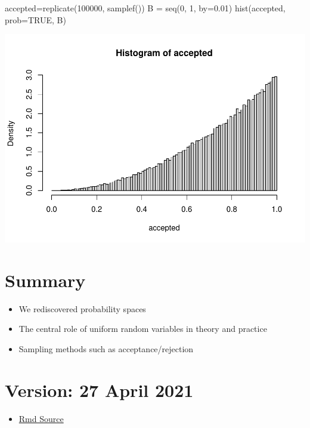 \documentclass[
]{article}
\newenvironment{Shaded}{\begin{snugshade}}{\end{snugshade}}
\newcommand{\AttributeTok}[1]{\textcolor[rgb]{0.77,0.63,0.00}{#1}}
\newcommand{\ConstantTok}[1]{\textcolor[rgb]{0.00,0.00,0.00}{#1}}
\newcommand{\DecValTok}[1]{\textcolor[rgb]{0.00,0.00,0.81}{#1}}
\newcommand{\FloatTok}[1]{\textcolor[rgb]{0.00,0.00,0.81}{#1}}
\newcommand{\FunctionTok}[1]{\textcolor[rgb]{0.00,0.00,0.00}{#1}}
\newcommand{\NormalTok}[1]{#1}
\newcommand{\OtherTok}[1]{\textcolor[rgb]{0.56,0.35,0.01}{#1}}
\providecommand{\tightlist}{%
  \setlength{\itemsep}{0pt}\setlength{\parskip}{0pt}}
\theoremstyle{definition}
\theoremstyle{definition}
\theoremstyle{definition}
\theoremstyle{remark}
\begin{document}
\begin{Shaded}
\begin{Highlighting}[]
\NormalTok{accepted}\OtherTok{=}\FunctionTok{replicate}\NormalTok{(}\DecValTok{100000}\NormalTok{, }\FunctionTok{samplef}\NormalTok{())}
\NormalTok{B }\OtherTok{=} \FunctionTok{seq}\NormalTok{(}\DecValTok{0}\NormalTok{, }\DecValTok{1}\NormalTok{, }\AttributeTok{by=}\FloatTok{0.01}\NormalTok{)}
\FunctionTok{hist}\NormalTok{(accepted, }\AttributeTok{prob=}\ConstantTok{TRUE}\NormalTok{, B)}
\end{Highlighting}
\end{Shaded}

\includegraphics{randomTP_files/figure-latex/unnamed-chunk-6-1.pdf}

\hypertarget{summary}{%
\section{Summary}\label{summary}}

\begin{itemize}
\tightlist
\item
  We rediscovered probability spaces
\item
  The central role of uniform random variables in theory and practice
\item
  Sampling methods such as acceptance/rejection
\end{itemize}

\hypertarget{version-27-april-2021}{%
\section{Version: 27 April 2021}\label{version-27-april-2021}}

\begin{itemize}
\tightlist
\item
  \href{https://tsoo-math.github.io/ucl/randomTP.Rmd}{Rmd Source}
\end{itemize}
\end{document}
